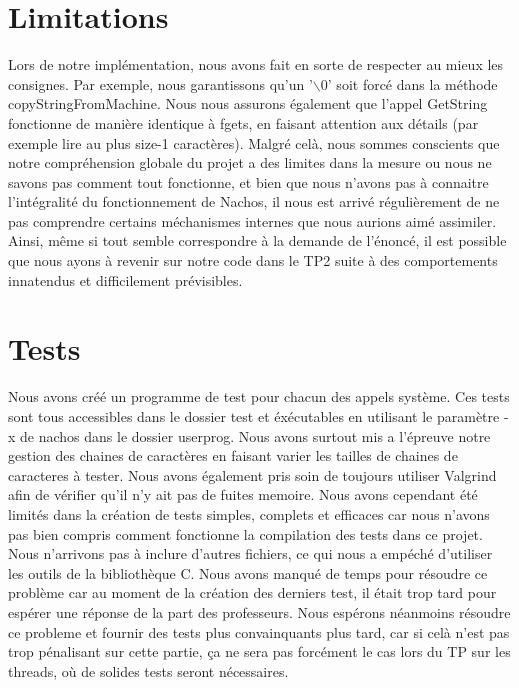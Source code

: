 \documentclass[12pt]{article}
\begin{document}
\section {Limitations}
Lors de notre implémentation, nous avons fait en sorte de respecter au mieux les consignes. Par exemple, nous garantissons qu'un '$\backslash$0' soit forcé dans la méthode \textcolor{red2}{copyStringFromMachine}. Nous nous assurons également que l'appel \textcolor{blue2}{GetString} fonctionne de manière identique à \textcolor{red2}{fgets}, en faisant attention aux détails (par exemple lire au plus size-1 caractères).
\newpage
Malgré celà, nous sommes conscients que notre compréhension globale du projet a des limites dans la mesure ou nous ne savons pas comment tout fonctionne, et bien que nous n'avons pas à connaitre l'intégralité du fonctionnement de Nachos, il nous est arrivé régulièrement de ne pas comprendre certains méchanismes internes que nous aurions aimé assimiler.
Ainsi, même si tout semble correspondre à la demande de l'énoncé, il est possible que nous ayons à revenir sur notre code dans le TP2 suite à des comportements innatendus et difficilement prévisibles.



\section {Tests}

Nous avons créé un programme de test pour chacun des appels système. Ces tests sont tous accessibles dans le dossier test et éxécutables en utilisant le paramètre -x de nachos dans le dossier userprog.
Nous avons surtout mis a l'épreuve notre gestion des chaines de caractères en faisant varier les tailles de chaines de caracteres à tester. Nous avons également pris soin de toujours utiliser Valgrind afin de vérifier qu'il n'y ait pas de fuites memoire.
Nous avons cependant été limités dans la création de tests simples, complets et efficaces car nous n'avons pas bien compris comment fonctionne la compilation des tests dans ce projet. Nous n'arrivons pas à inclure d'autres fichiers, ce qui nous a empéché d'utiliser les outils de la bibliothèque C.
\newline \newline
Nous avons manqué de temps pour résoudre ce problème car au moment de la création des derniers test, il était trop tard pour espérer une réponse de la part des professeurs.
Nous espérons néanmoins résoudre ce probleme et fournir des tests plus convainquants plus tard, car si celà n'est pas trop pénalisant sur cette partie, ça ne sera pas forcément le cas lors du TP sur les threads, où de solides tests seront nécessaires.
\end{document}
